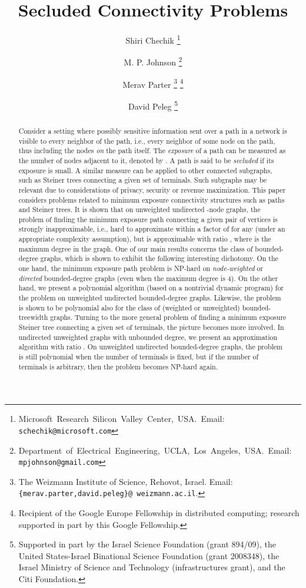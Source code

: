 \documentclass[12pt]{article}
\title{Secluded Connectivity Problems}
\author{
Shiri Chechik
\thanks{
\hbox{Microsoft Research Silicon Valley Center, USA. Email:}
{\tt schechik@microsoft.com}}
\and
M. P. Johnson
\thanks{
\hbox{Department of Electrical Engineering, UCLA, Los Angeles, USA. Email:}
{\tt mpjohnson@gmail.com}}
\and
Merav Parter
\thanks{The Weizmann Institute of Science, Rehovot, Israel.
Email: {\tt \{merav.parter,david.peleg\}@ weizmann.ac.il}.}
\thanks{Recipient of the Google Europe Fellowship in distributed computing;
 research supported in part by this Google Fellowship.}
\and
David Peleg 
\thanks{Supported in part by the Israel Science Foundation
(grant 894/09), the United States-Israel Binational Science Foundation
(grant 2008348), the Israel Ministry of Science and Technology
(infrastructures grant), and the Citi Foundation.}
}
\begin{document}
\maketitle

\begin{abstract}
Consider a setting where possibly sensitive information sent over a path in a network is visible to every {neighbor} of the path, i.e., every neighbor of some node on the path, thus including the nodes {\em on} the path itself. The {\em exposure} of a path  can be measured as the number of nodes adjacent to it, denoted by . A path is said to be {\em secluded} if its exposure is small. A similar measure can be applied to other connected subgraphs, such as Steiner trees connecting a given set of terminals. Such subgraphs may be relevant due to considerations of privacy, security or revenue maximization.
This paper considers problems related to minimum exposure connectivity structures such as paths and Steiner trees. It is shown that on unweighted undirected -node graphs, the problem of finding the minimum exposure path connecting a given pair of vertices is strongly inapproximable, i.e., hard to approximate within a factor of  for any  (under an appropriate complexity assumption), but is approximable with ratio , where  is the maximum degree in the graph. One of our main results concerns the class of bounded-degree graphs, which is shown to exhibit the following interesting dichotomy. On the one hand, the minimum exposure path problem is NP-hard on \emph{node-weighted} or \emph{directed} bounded-degree graphs (even when the maximum degree is 4). On the other hand, we present a polynomial algorithm (based on a nontrivial dynamic program) for the problem on unweighted undirected bounded-degree graphs. Likewise, the problem is shown to be polynomial also for the class of  (weighted or unweighted) bounded-treewidth graphs.
Turning to the more general problem of finding a minimum exposure Steiner tree connecting a given set of  terminals, the picture becomes more involved. In undirected unweighted graphs with unbounded degree, we present an approximation algorithm with ratio . On unweighted undirected bounded-degree graphs, the problem is still polynomial when the number of terminals is fixed, but if the number of terminals is arbitrary, then the problem becomes NP-hard again.
\end{abstract}
\end{document}
